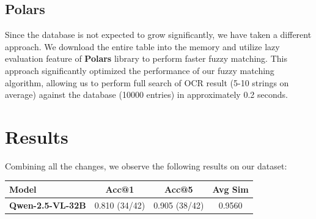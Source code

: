 \documentclass{article}
\begin{document}
\subsection{Polars}

Since the database is not expected to grow significantly, we have taken a different approach. We download the entire table into the memory and utilize lazy evaluation feature of \textbf{Polars} library to perform faster fuzzy matching. This approach significantly optimized the performance of our fuzzy matching algorithm, allowing us to perform full search of OCR result (5-10 strings on average) against the database (10000 entries) in approximately 0.2 seconds.

\section{Results}

Combining all the changes, we observe the following results on our dataset:

\begin{table}[H]
    \centering
    \begin{tabular}{|l|c|c|c|}
        \hline
        \textbf{Model} & \textbf{Acc@1} & \textbf{Acc@5} & \textbf{Avg Sim} \\
        \hline
        \textbf{Qwen-2.5-VL-32B} & 0.810 (34/42) & 0.905 (38/42) & 0.9560 \\
        \hline
    \end{tabular}
\end{table}
\end{document}

